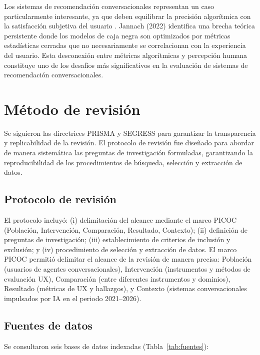 \documentclass[11pt,twocolumn]{article}
\begin{document}
Los sistemas de recomendación conversacionales representan un caso particularmente interesante, ya que deben equilibrar la precisión algorítmica con la satisfacción subjetiva del usuario \cite{jannach2022}. Jannach (2022) identifica una brecha teórica persistente donde los modelos de caja negra son optimizados por métricas estadísticas cerradas que no necesariamente se correlacionan con la experiencia del usuario. Esta desconexión entre métricas algorítmicas y percepción humana constituye uno de los desafíos más significativos en la evaluación de sistemas de recomendación conversacionales.

\section{Método de revisión}

Se siguieron las directrices PRISMA \cite{prisma2020} y SEGRESS \cite{segress2023} para garantizar la transparencia y replicabilidad de la revisión. El protocolo de revisión fue diseñado para abordar de manera sistemática las preguntas de investigación formuladas, garantizando la reproducibilidad de los procedimientos de búsqueda, selección y extracción de datos.

\subsection{Protocolo de revisión}

El protocolo incluyó: (i) delimitación del alcance mediante el marco PICOC (Población, Intervención, Comparación, Resultado, Contexto); (ii) definición de preguntas de investigación; (iii) establecimiento de criterios de inclusión y exclusión; y (iv) procedimiento de selección y extracción de datos. El marco PICOC permitió delimitar el alcance de la revisión de manera precisa: Población (usuarios de agentes conversacionales), Intervención (instrumentos y métodos de evaluación UX), Comparación (entre diferentes instrumentos y dominios), Resultado (métricas de UX y hallazgos), y Contexto (sistemas conversacionales impulsados por IA en el periodo 2021--2026).

\subsection{Fuentes de datos}

Se consultaron seis bases de datos indexadas (Tabla~\ref{tab:fuentes}):
\end{document}

